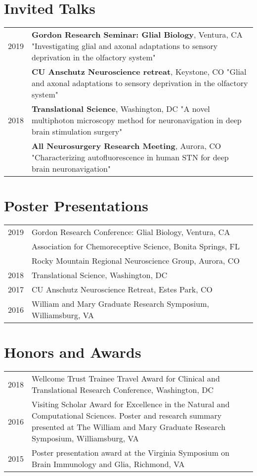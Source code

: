 \documentclass[11pt]{article}
\begin{document}
\section*{Invited Talks}
\label{sec:org3768243}
\begin{tabular}{lp{}}

2019& \textbf{Gordon Research Seminar: Glial Biology}, Ventura, CA \newline "Investigating glial and axonal adaptations to sensory deprivation in the olfactory system"\\
&\textbf{CU Anschutz Neuroscience retreat}, Keystone, CO \newline "Glial and axonal adaptations to sensory deprivation in the olfactory system" \\
2018& \textbf{Translational Science}, Washington, DC \newline "A novel multiphoton microscopy method for neuronavigation in deep brain stimulation surgery"\\
 & \textbf{All Neurosurgery Research Meeting}, Aurora, CO \newline "Characterizing autofluorescence in human STN for deep brain neuronavigation"\\
\end{tabular}
\section*{Poster Presentations}
\label{sec:orgfa86d30}
\begin{tabular}{lp{}}
2019& Gordon Research Conference: Glial Biology, Ventura, CA\\
& Association for Chemoreceptive Science, Bonita Springs, FL\\
& Rocky Mountain Regional Neuroscience Group, Aurora, CO\\
2018& Translational Science, Washington, DC\\
2017& CU Anschutz Neuroscience Retreat, Estes Park, CO\\
2016& William and Mary Graduate Research Symposium, Williamsburg, VA
\end{tabular}
\section*{Honors and Awards}
\label{sec:org1394795}
\begin{tabular}{lp{}}
2018& Wellcome Trust Trainee Travel Award for Clinical and Translational Research Conference, Washington, DC\\
2016& Visiting Scholar Award for Excellence in the Natural and Computational Sciences. Poster and research summary presented at The William and Mary Graduate Research Symposium, Williamsburg, VA \\
2015& Poster presentation award at the Virginia Symposium on Brain Immunology and Glia, Richmond, VA
\end{tabular}
\end{document}
